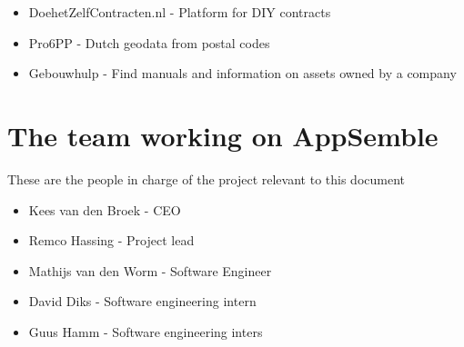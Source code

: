 \begin{itemize}
	\item DoehetZelfContracten.nl - Platform for DIY contracts
	\item Pro6PP - Dutch geodata from postal codes
	\item Gebouwhulp - Find manuals and information on assets owned by a company
\end{itemize}

\section{The team working on AppSemble}

These are the people in charge of the project relevant to this document

\begin{itemize}
	\item Kees van den Broek	- CEO
	\item Remco Hassing			- Project lead
	\item Mathijs van den Worm	- Software Engineer
	\item David Diks			- Software engineering intern
	\item Guus Hamm				- Software engineering inters
\end{itemize}
